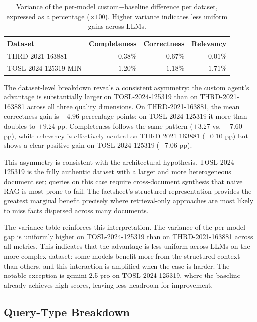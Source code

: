 \begin{table}[H]
\centering
\caption{Variance of the per-model custom$-$baseline difference per dataset, expressed
         as a percentage ($\times 100$). Higher variance indicates less uniform gains
         across LLMs.}
\label{tab:diff_variance}
\begin{tabular}{lrrr}
\toprule
\textbf{Dataset} & \textbf{Completeness} & \textbf{Correctness} & \textbf{Relevancy} \\
\midrule
THRD-2021-163881     & $0.38$\% & $0.67$\% & $0.01$\% \\
TOSL-2024-125319-MIN & $1.20$\% & $1.18$\% & $1.71$\% \\
\bottomrule
\end{tabular}
\end{table}

The dataset-level breakdown reveals a consistent asymmetry: the custom agent's advantage
is substantially larger on TOSL-2024-125319 than on THRD-2021-163881 across all three quality
dimensions. On THRD-2021-163881, the mean correctness gain is $+4.96$ percentage points; on
TOSL-2024-125319 it more than doubles to $+9.24$ pp. Completeness follows the same pattern
($+3.27$ vs.\ $+7.60$ pp), while relevancy is effectively neutral on THRD-2021-163881 ($-0.10$
pp) but shows a clear positive gain on TOSL-2024-125319 ($+7.06$ pp).

This asymmetry is consistent with the architectural hypothesis. TOSL-2024-125319 is the fully
authentic dataset with a larger and more heterogeneous document set; queries on this case
require cross-document synthesis that naive RAG is most prone to fail. The factsheet's
structured representation provides the greatest marginal benefit precisely where
retrieval-only approaches are most likely to miss facts dispersed across many documents.

The variance table reinforces this interpretation. The variance of the per-model gap is
uniformly higher on TOSL-2024-125319 than on THRD-2021-163881 across all metrics. This indicates that
the advantage is less uniform across LLMs on the more complex dataset: some models
benefit more from the structured context than others, and this interaction is amplified
when the case is harder. The notable exception is gemini-2.5-pro on TOSL-2024-125319, where the
baseline already achieves high scores, leaving less headroom for improvement.


\subsection{Query-Type Breakdown}
\label{sec:qtype-results}

